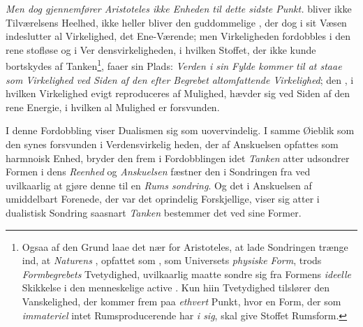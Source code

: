 \emph{Men dog gjennemfører Aristoteles ikke Enheden
til dette sidste Punkt.}  bliver ikke Tilværelsens
 \setcounter{footnote}{0}
Heelhed, ikke heller bliver den guddommelige , der dog
i sit Væsen indeslutter al Virkelighed, det Ene-Værende; men
Virkeligheden fordobbles i den rene stofløse  og i Ver\-%
densvirkeligheden, i hvilken Stoffet, der ikke kunde bortskydes
af Tanken\footnote{Ogsaa af den Grund laae det nær for Aristoteles, at
lade Sondringen trænge ind, at \emph{Naturens} , opfattet som
, som Universets \emph{physiske Form}, trods \emph{Formbegrebets}
Tvetydighed, uvilkaarlig maatte sondre sig fra Formens \emph{ideelle}
Skikkelse i den menneskelige active . Kun hiin Tvetydighed
tilslører den Vanskelighed, der kommer frem paa \emph{ethvert} Punkt,
hvor en Form, der som \emph{immateriel} intet Rumsproducerende har
\emph{i sig}, skal give Stoffet Rumsform.}, faaer sin Plads: \emph{Verden i sin Fylde kommer
til at staae som Virkelighed ved Siden af den efter
Begrebet altomfattende Virkelighed}; den , i
hvilken Virkelighed evigt reproduceres af Mulighed, hævder
sig ved Siden af den rene Energie, i hvilken al Mulighed er
forsvunden.

I denne Fordobbling viser Dualismen sig som uovervindelig.
I samme Øieblik som den synes forsvunden i Verdensvirkelig\-%
heden, der af Anskuelsen opfattes som harmnoisk Enhed, bryder
den frem i Fordobblingen idet \emph{Tanken} atter udsondrer Formen
i dens \emph{Reenhed} og \emph{Anskuelsen} fæstner den i Sondringen
fra  ved uvilkaarlig at gjøre denne til en \emph{Rums\-%
sondring}. Og det i Anskuelsen af  umiddelbart Forenede,
der var det oprindelig Forskjellige, viser sig atter i dualistisk
Sondring saasnart \emph{Tanken} bestemmer det ved sine Former.

